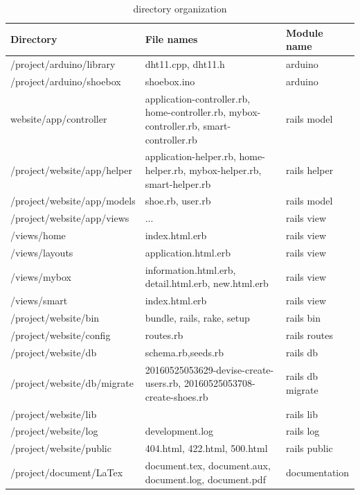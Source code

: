 \documentclass[conference]{IEEEtran}
\begin{document}
\begin{table}[H]
\renewcommand{\arrayrulewidth}{1pt}
\renewcommand{\arraystretch}{2}
\begin{tabular}
{|m{3cm}|m{2.2cm}|m{2.2cm}|}\hline

Directory & File names & Module name\\ \hline
/project/arduino/library & dht11.cpp, dht11.h & arduino\\ \hline
/project/arduino/shoebox & shoebox.ino & arduino\\ \hline
website/app/controller & application-controller.rb, home-controller.rb, mybox-controller.rb, smart-controller.rb & rails model\\ \hline
/project/website/app/helper & application-helper.rb, home-helper.rb, mybox-helper.rb, smart-helper.rb & rails helper\\ \hline
/project/website/app/models & shoe.rb, user.rb & rails model\\ \hline
/project/website/app/views & ... & rails view\\ \hline
/views/home & index.html.erb & rails view\\ \hline
/views/layouts & application.html.erb & rails view\\ \hline
/views/mybox & information.html.erb, detail.html.erb, new.html.erb & rails view\\ \hline
/views/smart & index.html.erb & rails view\\ \hline
/project/website/bin & bundle, rails, rake, setup & rails bin\\ \hline
/project/website/config & routes.rb & rails routes\\ \hline
/project/website/db & schema.rb,seeds.rb & rails db\\ \hline
/project/website/db/migrate & 20160525053629-devise-create-users.rb, 20160525053708-create-shoes.rb & rails db migrate\\ \hline
/project/website/lib & & rails lib\\ \hline
/project/website/log & development.log & rails log\\ \hline
/project/website/public & 404.html, 422.html, 500.html & rails public\\ \hline
/project/document/LaTex & document.tex, document.aux, document.log, document.pdf & documentation\\ \hline


\end{tabular}
\\
\\
\caption{directory organization}
\label{tab:template}
\end{table}
\end{document}
